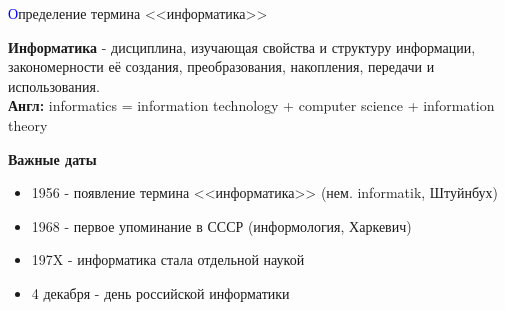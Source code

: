 \begin{frame}[t]{\large \textcolor{blue}{О}пределение термина <<информатика>>}
	
	\noindent \color[rgb]{0,0.7,0.4} \textbf{Информатика} \color{black}- дисциплина, изучающая свойства и структуру информации, закономерности её создания, преобразования, накопления, передачи и использования. \\
	
	\noindent \color[rgb]{0,0.7,0.4} \textbf{Англ:} \color{black} informatics = information technology + computer science + information theory
	\vspace{1.5em}
	
	\begin{center}
		\textbf{Важные даты}
	\end{center}

	\vspace{-2mm}

	\begin{itemize}
		\item 1956 - появление термина <<информатика>> (нем. informatik, Штуйнбух)
		\item 1968 - первое упоминание в СССР (информология, Харкевич)
		\item 197X - информатика стала отдельной наукой
		\item 4 декабря - день российской информатики
	\end{itemize}

\end{frame}